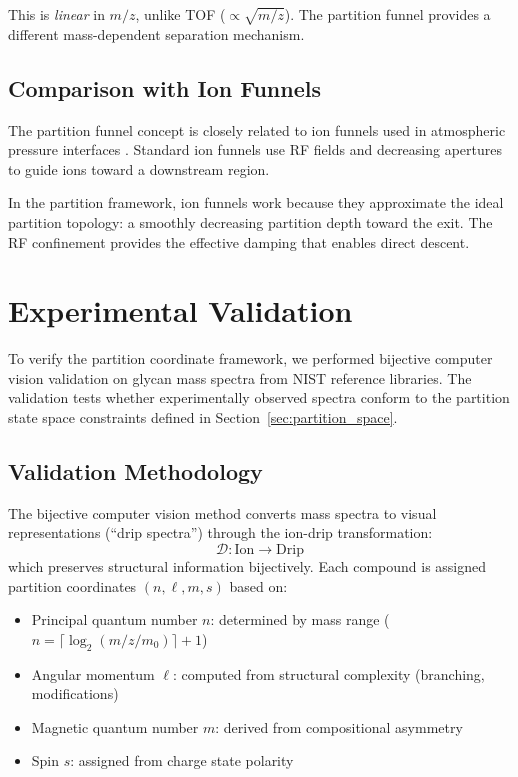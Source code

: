 \documentclass[twocolumn,10pt,a4paper]{article}
\theoremstyle{definition}
\theoremstyle{remark}
\begin{document}
This is \emph{linear} in $m/z$, unlike TOF ($\propto \sqrt{m/z}$). The partition funnel provides a different mass-dependent separation mechanism.

\subsection{Comparison with Ion Funnels}

The partition funnel concept is closely related to ion funnels used in atmospheric pressure interfaces \citep{shaffer1997}. Standard ion funnels use RF fields and decreasing apertures to guide ions toward a downstream region.

In the partition framework, ion funnels work because they approximate the ideal partition topology: a smoothly decreasing partition depth toward the exit. The RF confinement provides the effective damping that enables direct descent.

\section{Experimental Validation}
\label{sec:validation}

To verify the partition coordinate framework, we performed bijective computer vision validation on glycan mass spectra from NIST reference libraries. The validation tests whether experimentally observed spectra conform to the partition state space constraints defined in Section~\ref{sec:partition_space}.

\subsection{Validation Methodology}

The bijective computer vision method converts mass spectra to visual representations (``drip spectra'') through the ion-drip transformation:
\begin{equation}
    \mathcal{D}: \text{Ion} \to \text{Drip}
    \label{eq:ion_drip}
\end{equation}
which preserves structural information bijectively. Each compound is assigned partition coordinates $(n, \ell, m, s)$ based on:
\begin{itemize}
    \item Principal quantum number $n$: determined by mass range ($n = \lceil \log_2(m/z / m_0) \rceil + 1$)
    \item Angular momentum $\ell$: computed from structural complexity (branching, modifications)
    \item Magnetic quantum number $m$: derived from compositional asymmetry
    \item Spin $s$: assigned from charge state polarity
\end{itemize}
\end{document}
